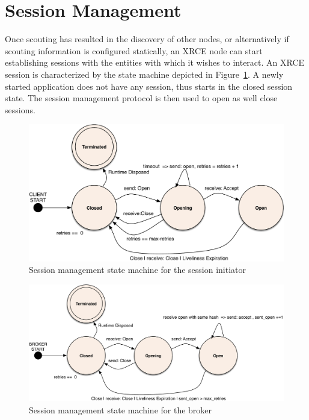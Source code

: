 \documentclass[a4paper,oneside,article]{memoir}
\begin{document}

\section{Session Management}

Once scouting has resulted in the discovery of other nodes, or alternatively if scouting information
is configured statically, an XRCE node can start establishing sessions with the entities with which
it wishes to interact.  An XRCE session is characterized by the state machine depicted in
Figure~\ref{fig:session-initiator}.  A newly started application does not have any session, thus
starts in the closed session state.  The session management protocol is then used to open as well
close sessions.

\begin{figure}
\centering
\includegraphics[scale=0.4]{session-initiator.pdf}
\caption{Session management state machine for the session initiator}\label{fig:session-initiator}
\end{figure}

\begin{figure}
\centering
\includegraphics[scale=0.4]{session-acceptor.pdf}
\caption{Session management state machine for the broker}\label{fig:session-acceptor}
\end{figure}
\end{document}
